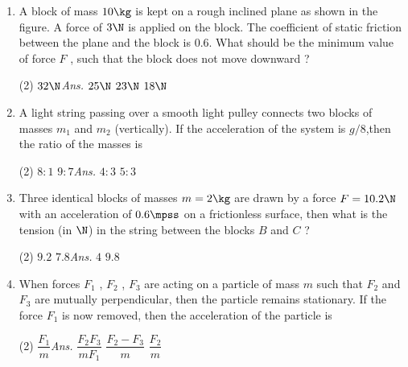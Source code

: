 \documentclass{article}
\newcommand{\ans}{\textcolor{red!95}{\textit{\quad Ans.}}}
\begin{document}
\begin{enumerate}
\item A block of mass $10\kg$ is kept on a rough inclined plane as shown in the figure. A force of $3 \N$ is applied on the block. The coefficient of static friction between the plane and the block is $0.6$. What should be the minimum value of force $F$ , such that the block does not move downward ?
\begin{center}
\end{center}
\begin{tasks}(2)
	\task $32\N$\ans
	\task $25\N$
	\task $23\N$
	\task $18\N$
\end{tasks}


\item A light string passing over a smooth light pulley connects two blocks of masses $m_1$ and $m_2$ (vertically). If the acceleration of the system is $g/8$,then the ratio of the masses is
\begin{tasks}(2)
	\task $8:1$
	\task $9:7$\ans
	\task $4:3$
	\task $5:3$
\end{tasks}

\item Three identical blocks of masses $m = 2 \kg$ are drawn by a force $F=10.2 \N$ with an acceleration of $0.6 \mpss$ on a frictionless surface, then what is the tension (in $\N$) in the string between the blocks $B$ and $C$ ?
\begin{center}
\end{center}	
\begin{tasks}(2)
	\task $9.2$
	\task $7.8$\ans
	\task $4$
	\task $9.8$
\end{tasks}

\item When forces $F_1$ , $F_2$ , $F_3$ are acting on a particle
of mass $m$ such that $F_2$ and $F_3$ are mutually perpendicular, then the particle remains stationary. If the force $F_1$ is now removed, then the acceleration of the particle is
\begin{tasks}(2)
	\task $\dfrac{F_1}{m}$\ans
	\task $\dfrac{F_2F_3}{mF_1}$
	\task $\dfrac{F_2-F_3}{m}$
	\task $\dfrac{F_2}{m}$
\end{tasks}



\end{enumerate}
\end{document}
